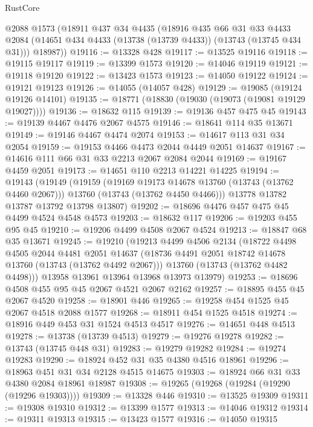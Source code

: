 \begin{lexlean}{RustCore}
\begin{coremodule}
    @2088
    @1573
    (@18911
      @437
      @34
      @4435
      (@18916
        @435
        @66
        @31
        @33
        @4433
        @2084
        (@14651 @434 @4433 (@13738 (@13739 @4433)) (@13743 (@13745 @434 @31)))
        @18987))
@19116 := @13328 @428
@19117 := @13525 @19116
@19118 := @19115 @19117
@19119 := @13399 @1573
@19120 := @14046 @19119
@19121 := @19118 @19120
@19122 := @13423 @1573
@19123 := @14050 @19122
@19124 := @19121 @19123
@19126 := @14055 (@14057 @428)
@19129 := @19085 (@19124 @19126 @14101)
@19135 := @18771 (@18830 (@19030 (@19073 (@19081 @19129 @19027))))
@19136 := @18632 @115
@19139 := @19136 @457 @475 @45
@19143 := @19139 @4467 @4476 @2067 @4575
@19146 := @18641 @114 @35 @13671
@19149 := @19146 @4467 @4474 @2074
@19153 := @14617 @113 @31 @34 @2054
@19159 := @19153 @4466 @4473 @2044 @4449 @2051 @14637
@19167 := @14616 @111 @66 @31 @33 @2213 @2067 @2084 @2044
@19169 := @19167 @4459 @2051
@19173 := @14651 @110 @2213 @14221 @14225
@19194 := @19143
    (@19149
      (@19159
        (@19169 @19173 @14678 @13760 (@13743 (@13762 @4460 @2067)))
        @13760
        (@13743 (@13762 @4450 @4466)))
      @13778
      @13782
      @13787
      @13792
      @13798
      @13807)
@19202 := @18696 @4476 @457 @475 @45 @4499 @4524 @4548 @4573
@19203 := @18632 @117
@19206 := @19203 @455 @95 @45
@19210 := @19206 @4499 @4508 @2067 @4524
@19213 := @18847 @68 @35 @13671
@19245 := @19210
    (@19213
      @4499
      @4506
      @2134
      (@18722
        @4498
        @4505
        @2044
        @4481
        @2051
        @14637
        (@18736 @4491 @2051 @18742 @14678 @13760 (@13743 (@13762 @4492 @2067)))
        @13760
        (@13743 (@13762 @4482 @4498)))
      @13958
      @13961
      @13964
      @13968
      @13973
      @13979)
@19253 := @18696 @4508 @455 @95 @45 @2067 @4521 @2067 @2162
@19257 := @18895 @455 @45 @2067 @4520
@19258 := @18901 @446
@19265 := @19258 @454 @1525 @45 @2067 @4518 @2088 @1577
@19268 := @18911 @454 @1525 @4518
@19274 := @18916 @449 @453 @31 @1524 @4513 @4517
@19276 := @14651 @448 @4513
@19278 := @13738 (@13739 @4513)
@19279 := @19276 @19278
@19282 := @13743 (@13745 @448 @31)
@19283 := @19279 @19282
@19284 := @19274 @19283
@19290 := @18924 @452 @31 @35 @4380 @4516 @18961
@19296 := @18963 @451 @31 @34 @2128 @4515 @14675
@19303 := @18924 @66 @31 @33 @4380 @2084 @18961 @18987
@19308 := @19265 (@19268 (@19284 (@19290 (@19296 @19303))))
@19309 := @13328 @446
@19310 := @13525 @19309
@19311 := @19308 @19310
@19312 := @13399 @1577
@19313 := @14046 @19312
@19314 := @19311 @19313
@19315 := @13423 @1577
@19316 := @14050 @19315

\end{coremodule}
\end{lexlean}
